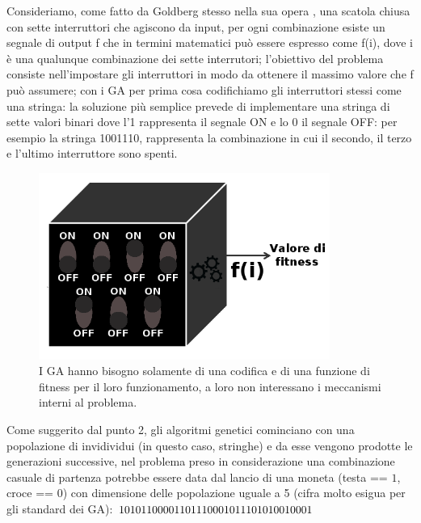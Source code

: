 Consideriamo, come fatto da Goldberg stesso nella sua opera \cite{goldberg1}, una scatola chiusa con sette interruttori che agiscono da input, per ogni combinazione esiste un segnale di output f che in termini matematici pu\`o essere espresso come f(i), dove i \`e una qualunque combinazione dei sette interrutori; l'obiettivo del problema consiste nell'impostare gli interruttori in modo da ottenere il massimo valore che f pu\`o assumere; con i GA per prima cosa codifichiamo gli interruttori stessi come una stringa: la soluzione pi\`u semplice prevede di implementare una stringa di sette valori binari dove l'1 rappresenta il segnale ON e lo 0 il segnale OFF: per esempio la stringa 1001110, rappresenta la combinazione in cui il secondo, il terzo e l'ultimo interruttore sono spenti.
\begin{figure}[H]
    \centering
    \hfill
    \includegraphics[width=0.85\textwidth]{Images/immagine1.png}
    \hspace*{\fill}
    \caption{I GA hanno bisogno solamente di una codifica e di una funzione di fitness per il loro funzionamento, a loro non interessano i meccanismi interni al problema.}
    \label{fig:box_switches}
\end{figure}
Come suggerito dal punto 2, gli algoritmi genetici cominciano con una popolazione di invidividui (in questo caso, stringhe) e da esse vengono prodotte le generazioni successive, nel problema preso in considerazione una combinazione casuale di partenza potrebbe essere data dal lancio di una moneta (testa == $1$, croce == $0$) con dimensione delle popolazione uguale a 5 (cifra molto esigua per gli standard dei GA):\vspace{3mm}
\break
$1010110\break
0001101\break
1100010\break
1110101\break
0010001$\vspace{3mm}

